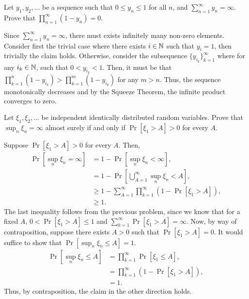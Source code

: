 \begin{problem}{1}
    Let $y_1, y_2,\ldots$ be a sequence such that $0 \leq y_n \leq 1$ for all $n$, and $\sum_{n=1}^\infty y_n = \infty$. Prove that $\prod_{n=1}^\infty (1-y_n) = 0$.
\end{problem}
\begin{solution}
    Since $\sum_{n=1}^\infty y_n = \infty$, there must exists infinitely many non-zero elements. Consider first the trivial case where there exists $i \in \mathbb{N}$ such that $y_i = 1$, then trivially the claim holds. Otherwise, consider the subsequence $\{y_{i_k}\}_{k=1}^\infty$ where for any $i_k\in\mathbb{N}$, such that $0 < y_{i_k} < 1$. Then, it must be that $\prod_{k=1}^{n} (1-y_{i_k}) > \prod_{k=1}^m (1-y_{i_k})$ for any $m > n$. Thus, the sequence monotonically decreases and by the Squeeze Theorem, the infinite product converges to zero.
\end{solution}

\begin{problem}{2}
    Let $\xi_1,\xi_2,\ldots$ be independent identically distributed random variables. Prove that $\sup_n \xi_n = \infty$ almost surely if and only if $\Pr[\xi_1 > A] > 0$ for every $A$. 
\end{problem}
\begin{solution}
    Suppose $\Pr[\xi_1 > A] > 0$ for every $A$. Then, 
    \begin{align*}
        \Pr[\sup_n \xi_n = \infty] &= 1 - \Pr[\sup_n \xi_n < \infty], \\
        &= 1 - \Pr\left[\bigcup_{A = 1}^\infty \sup_n \xi_n < A \right], \\
        &\geq 1 - \sum_{A=1}^\infty \prod_{k=1}^\infty (1 - \Pr[\xi_1 > A]), \\
        &\geq 1.
    \end{align*}
    The last inequality follows from the previous problem, since we know that for a fixed $A$, $0 < \Pr[\xi_1 > A] \leq 1$ and $\sum_{k=1}^\infty \Pr[\xi_1 > A] = \infty$. Now, by way of contraposition, suppose there exists $A > 0$ such that $\Pr[\xi_1 > A] = 0$. It would suffice to show that $\Pr[\sup_n \xi_n \leq A] = 1$. 
    \begin{align*}
        \Pr[\sup_n \xi_n \leq A] &= \prod_{k=1}^\infty \Pr[\xi_1 \leq A], \tag{by i.i.d.}\\
        &= \prod_{k=1}^\infty (1- \Pr[\xi_1 > A]), \\
        &= 1.
    \end{align*}
    Thus, by contraposition, the claim in the other direction holds.
\end{solution}

